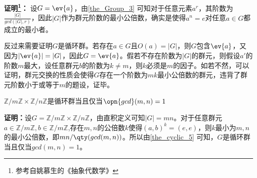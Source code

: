 \textbf{证明\footnote{参考自姚慕生的《抽象代数学》}：}
设$G=\ev{a}$，由\autoref{the_Group_3} 可知对于任意元素$a^r$，其阶数为$\frac{|G|}{gcd(|G|,r)}$，因此$|G|$作为群元阶数的最小公倍数，确实是使得$a^n=e$对任意$a\in G$都成立的最小者。

反过来需要证明$G$是循环群。若存在$a\in G$且$O(a)=|G|$，则$G$包含$\ev{a}$，又因为$|\ev{a}|=|G|$，因此$G=\ev{a}$。假若不存在阶数为$|G|$的群元，则假设$a'$的阶数$m$最大，设任意群元$b$的阶数为$k\neq m$，则$k$必须是$m$的因子。如若不然，可以证明，群元交换的性质会使得$G$存在一个阶数为$mk$最小公倍数的群元，违背了群元阶数小于或等于$m$的题设，证毕。

\begin{corollary}{}
$\mathbb{Z} / m \mathbb{Z} \times \mathbb{Z} / n \mathbb{Z}$是循环群当且仅当$\opn{gcd}(m,n)=1$
\end{corollary}
\textbf{证明：}设$G=\mathbb{Z} / m \mathbb{Z} \times \mathbb{Z} / n \mathbb{Z}$，由直积定义可知$|G|=mn$。对于任意群元$a\in \mathbb{Z} / m \mathbb{Z},b\in \mathbb{Z} / m \mathbb{Z}$,存在$m,n$的公倍数$k$使得$(a,b)^k=(e,e)$，则$k$最小为$m,n$的最小公倍数，即$mn/\qty(gcd(m,n))$。所以由\autoref{the_cyclic_5}  可知，$G$是循环群当且仅当$gcd(m,n)=1$。